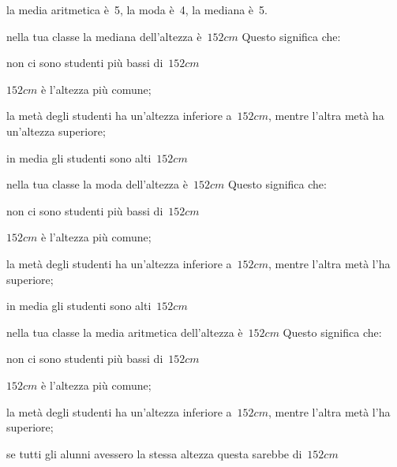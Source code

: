 \begin{esercizio}
\begin{enumerate*}
\begin{enumeratea}
\item la media aritmetica è~5, la moda è~4, la mediana è~5.
 \end{enumeratea}
\item nella tua classe la mediana dell'altezza è~\(152\unit{cm}\) Questo 
significa che:
 \begin{enumeratea}
\item non ci sono studenti più bassi di~\(152\unit{cm}\)
\item \(152\unit{cm}\) è l'altezza più comune;
\item la metà degli studenti ha un'altezza inferiore a~\(152\unit{cm}\), 
mentre l'altra metà ha un'altezza superiore;
\item in media gli studenti sono alti~\(152\unit{cm}\)
 \end{enumeratea}
\item nella tua classe la moda dell'altezza è~\(152\unit{cm}\) Questo 
significa che:
 \begin{enumeratea}
\item non ci sono studenti più bassi di~\(152\unit{cm}\)
\item \(152\unit{cm}\) è l'altezza più comune;
\item la metà degli studenti ha un'altezza inferiore a~\(152\unit{cm}\), 
mentre l'altra metà l'ha superiore;
\item in media gli studenti sono alti~\(152\unit{cm}\)
 \end{enumeratea}
\item nella tua classe la media aritmetica dell'altezza è~\(152\unit{cm}\) 
Questo significa che:
 \begin{enumeratea}
\item non ci sono studenti più bassi di~\(152\unit{cm}\)
\item \(152\unit{cm}\) è l'altezza più comune;
\item la metà degli studenti ha un'altezza inferiore a~\(152\unit{cm}\), 
mentre l'altra metà l'ha superiore;
\item se tutti gli alunni avessero la stessa altezza questa sarebbe 
di~\(152\unit{cm}\)
 \end{enumeratea}
\end{enumerate*}
\end{esercizio}

